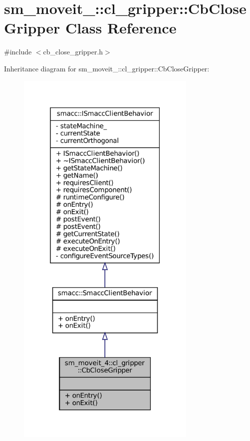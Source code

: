 \hypertarget{classsm__moveit__4_1_1cl__gripper_1_1CbCloseGripper}{}\section{sm\+\_\+moveit\+\_\+:\+:cl\+\_\+gripper\+:\+:Cb\+Close\+Gripper Class Reference}
\label{classsm__moveit__4_1_1cl__gripper_1_1CbCloseGripper}


{\ttfamily \#include $<$cb\+\_\+close\+\_\+gripper.\+h$>$}



Inheritance diagram for sm\+\_\+moveit\+\_\+:\+:cl\+\_\+gripper\+:\+:Cb\+Close\+Gripper\+:
\nopagebreak
\begin{figure}[H]
\begin{center}
\leavevmode
\includegraphics[width=244pt]{classsm__moveit__4_1_1cl__gripper_1_1CbCloseGripper__inherit__graph}
\end{center}
\end{figure}



